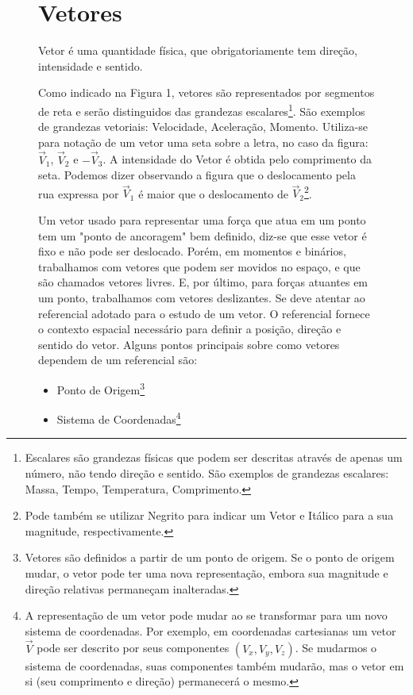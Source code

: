 \documentclass[a4paper, 14pt, twoside]{article}
\begin{document}
\begin{figure}[h]
\begin{minipage}[t]{0.60\textwidth}
    \section{Vetores}
    \begin{tcolorbox}[colframe=lockheed, colback=white, title=Definição de Vetor, fonttitle=\bfseries]
        Vetor é uma quantidade física, que obrigatoriamente tem \textcolor{lockheed}{direção}, \textcolor{lockheed}{intensidade} e \textcolor{lockheed}{sentido}.
    \end{tcolorbox}
    
    Como indicado na Figura 1, vetores são representados por segmentos de reta e serão distinguidos das \textcolor{lockheed}{grandezas escalares}\footnote{Escalares são grandezas físicas que podem ser descritas através de apenas um número, não tendo direção e sentido. São exemplos de grandezas escalares: Massa, Tempo, Temperatura, Comprimento.}.
    São exemplos de grandezas vetoriais: Velocidade, Aceleração, Momento. Utiliza-se para notação de um vetor uma seta sobre a letra, no caso da figura: $\vec{V}_1$, $\vec{V}_2$ e $- \vec{V}_3$. A intensidade do Vetor é obtida pelo comprimento da seta. Podemos dizer observando a figura que o deslocamento pela rua expressa por $\vec{V}_1$ é maior que o deslocamento de $\vec{V}_2$\footnote{Pode também se utilizar Negrito para indicar um Vetor e Itálico para a sua magnitude, respectivamente.}.
    
    Um vetor usado para representar uma força que atua em um ponto tem um "ponto de ancoragem" bem definido, diz-se que esse vetor é \textcolor{lockheed}{fixo} e não pode ser deslocado. Porém, em momentos e binários, trabalhamos com vetores que podem ser movidos no espaço, e que são chamados \textcolor{lockheed}{vetores livres}. E, por último, para forças atuantes em um ponto, trabalhamos com \textcolor{lockheed}{vetores deslizantes}.
    Se deve atentar ao referencial adotado para o estudo de um vetor. O referencial fornece o contexto espacial necessário para definir a posição, direção e sentido do vetor. Alguns pontos principais sobre como vetores dependem de um referencial são:
    \begin{itemize}
        \item \textcolor{lockheed}{Ponto de Origem}\footnote{Vetores são definidos a partir de um ponto de origem. Se o ponto de origem mudar, o vetor pode ter uma nova representação, embora sua magnitude e direção relativas permaneçam inalteradas.}
        \item \textcolor{lockheed}{Sistema de Coordenadas}\footnote{A representação de um vetor pode mudar ao se transformar para um novo sistema de coordenadas. Por exemplo, em coordenadas cartesianas um vetor $\vec{V}$ pode ser descrito por seus componentes $(V_x, V_y, V_z)$. Se mudarmos o sistema de coordenadas, suas componentes também mudarão, mas o vetor em si (seu comprimento e direção) permanecerá o mesmo.}
    \end{itemize}
    

\end{minipage}
\end{figure}
\end{document}
